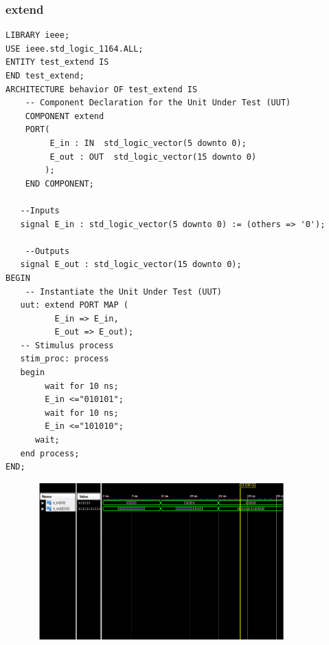 \documentclass{article}
\begin{document}
\subsubsection{extend}\label{sec:intro}
\begin{lstlisting}
LIBRARY ieee;
USE ieee.std_logic_1164.ALL;
ENTITY test_extend IS
END test_extend; 
ARCHITECTURE behavior OF test_extend IS  
    -- Component Declaration for the Unit Under Test (UUT) 
    COMPONENT extend
    PORT(
         E_in : IN  std_logic_vector(5 downto 0);
         E_out : OUT  std_logic_vector(15 downto 0)
        );
    END COMPONENT;
    
   --Inputs
   signal E_in : std_logic_vector(5 downto 0) := (others => '0');

 	--Outputs
   signal E_out : std_logic_vector(15 downto 0);
BEGIN 
	-- Instantiate the Unit Under Test (UUT)
   uut: extend PORT MAP (
          E_in => E_in,
          E_out => E_out);
   -- Stimulus process
   stim_proc: process
   begin		
		wait for 10 ns;
		E_in <="010101";
		wait for 10 ns;
		E_in <="101010";
      wait;
   end process;
END;
\end{lstlisting}
\includegraphics[width=12cm, height=6cm]{test_extend.png}
\pagebreak
\end{document}
